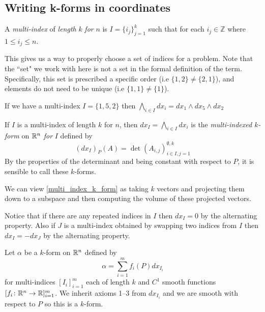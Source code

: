 \documentclass[notes]{subfiles}
\begin{document}
\subsection{Writing k-forms in coordinates}
\begin{definition}
    A \textit{multi-index} of \textit{length} $k$ \textit{for} $n$ is $I = \{i_j\}_{j = 1}^k$ such that for each $i_j \in \mathbb{Z}$ where $1 \leq i_j \leq n$.
\end{definition}
This gives us a way to properly choose a set of indices for a problem. Note that the ``set" we work with here is not a set in the formal definition of the term. Specifically, this set is prescribed a specific order (i.e $\{ 1, 2 \} \neq \{ 2, 1 \}$), and elements do not need to be unique (i.e $\{ 1, 1 \} \neq \{ 1 \}$).

\begin{example}
    If we have a multi-index $I = \{1, 5, 2\}$ then $\bigwedge_{i \in I} dx_i = dx_1 \wedge dx_5 \wedge dx_2$
\end{example}

\begin{definition} \label{multi_index_k_form}
    If $I$ is a multi-index of length $k$ for $n$, then $dx_I = \bigwedge_{i \in I} dx_i$ is the \textit{multi-indexed $k$-form} on $\mathbb{R}^n$ \textit{for} $I$ defined by
    \[
        (dx_I)_P(A)
        = \det(A_{i, j})_{i \in I, j = 1}^{\emptyset, k}
    \]
    By the properties of the determinant and being constant with respect to $P$, it is sensible to call these $k$-forms.
\end{definition}

We can view \cref{multi_index_k_form} as taking $k$ vectors and projecting them down to a subspace and then computing the volume of these projected vectors.

Notice that if there are any repeated indices in $I$ then $dx_I = 0$ by the alternating property. Also if $J$ is a multi-index obtained by swapping two indices from $I$ then $dx_I = -dx_J$ by the alternating property.

\begin{example}
    Let $\alpha$ be a $k$-form on $\mathbb{R}^n$ defined by
    \[
        \alpha = \sum_{i = 1}^m f_i(P) dx_{I_i}
    \]
    for multi-indices $[I_i]_{i = 1}^m$ each of length $k$ and $C^1$ smooth functions $[f_i\colon \mathbb{R}^n \to \mathbb{R}]_{i = 1}^m$. We inherit axioms 1--3 from $dx_{I_i}$ and we are smooth with respect to $P$ so this is a $k$-form.
\end{example}
\end{document}
